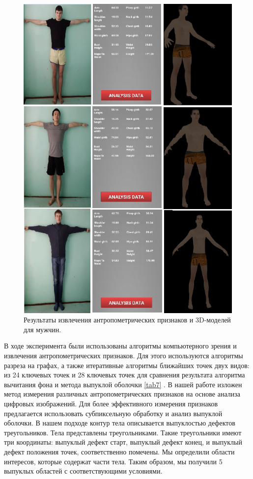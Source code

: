 \begin{figure}[ht!]
\centering
\includegraphics [scale=0.5] {images/h37.png}
\begin{center}
\caption{Результаты извлечения антропометрических признаков и 3D-моделей для мужчин.} \label{img37}
\end{center}
\end{figure}

В ходе эксперимента были использованы алгоритмы компьютерного зрения и извлечения антропометрических признаков. Для этого используются алгоритмы разреза на графах, а также итеративные алгоритмы ближайших точек двух видов: из 24 ключевых точек и 28 ключевых точек для сравнения результата алгоритма вычитания фона и метода выпуклой оболочки \ref{tab7} . В нашей работе \cite{long1} изложен метод измерения различных антропометрических признаков на основе анализа цифровых изображений. Для более эффективного измерения признаков предлагается использовать субпиксельную обработку и анализ выпуклой оболочки. В нашем подходе контур тела описывается выпуклостью дефектов треугольников. Тела представлены треугольниками. Такие треугольники имеют три координаты: выпуклый дефект старт, выпуклый дефект конец, и выпуклый дефект положения точек, соответственно помечены. Мы определили области интересов, которые содержат части тела. Таким образом, мы получили 5 выпуклых областей с соответствующими условиями.

